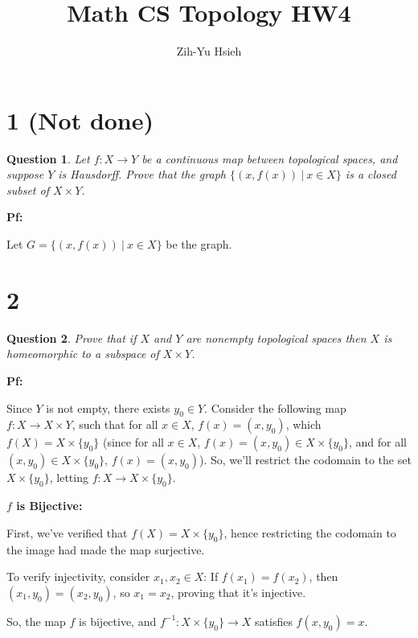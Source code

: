 \documentclass{article}
\title{Math CS Topology HW4}
\author{Zih-Yu Hsieh}
\newtheorem{question}{Question}
\begin{document}
\maketitle

\section*{1 (Not done)}
\begin{myBox}[]{}
    \begin{question}
        Let $f:X\rightarrow Y$ be a continuous map between topological spaces, and suppose
        $Y$ is Hausdorff. Prove that the graph $\{(x,f(x))\ |\ x\in X\}$ is a closed subset of
        $X\times Y$.
    \end{question}
\end{myBox}

\textbf{Pf:}

Let $G=\{(x,f(x))\ |\ x\in X\}$ be the graph.

\break

\section*{2}
\begin{myBox}[]{}
    \begin{question}
        Prove that if $X$ and $Y$ are nonempty topological spaces then 
        $X$ is homeomorphic to a subspace of $X\times Y$.
    \end{question}
\end{myBox}

\textbf{Pf:}

Since $Y$ is not empty, there exists $y_0\in Y$. Consider the following map $f:X\rightarrow X\times Y$, such that for all $x\in X$,
$f(x)=(x,y_0)$, which $f(X)=X\times \{y_0\}$ (since for all $x\in X$, $f(x)=(x,y_0)\in X\times \{y_0\}$, and for all $(x,y_0)\in X\times \{y_0\}$, $f(x)=(x,y_0)$).
So, we'll restrict the codomain to the set $X\times \{y_0\}$, letting $f:X\rightarrow X\times \{y_0\}$.

\hfill

\textbf{$f$ is Bijective:}

First, we've verified that $f(X)=X\times \{y_0\}$, hence restricting the codomain to the image had made the map surjective.

To verify injectivity, consider $x_1,x_2 \in X$: If $f(x_1)=f(x_2)$, then $(x_1,y_0)=(x_2,y_0)$, so $x_1=x_2$, proving that it's injective.

So, the map $f$ is bijective, and $f^{-1}:X\times \{y_0\}\rightarrow X$ satisfies $f(x,y_0)=x$.
\end{document}
